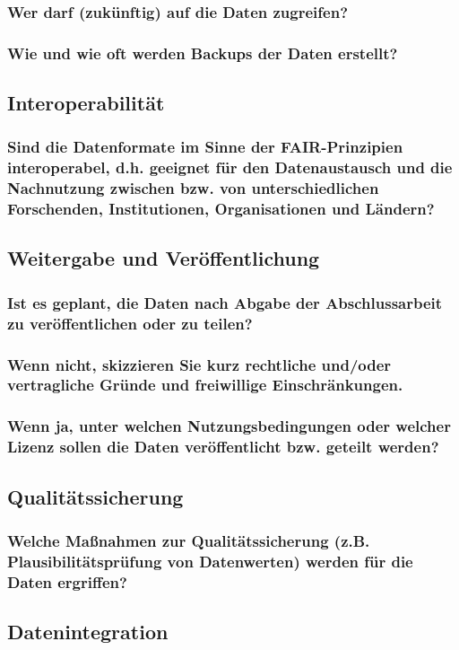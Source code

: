 \subsubsection*{Wer darf (zukünftig) auf die Daten zugreifen?}
\subsubsection*{Wie und wie oft werden Backups der Daten erstellt? }
\subsection*{Interoperabilität}
\subsubsection*{Sind die Datenformate im Sinne der FAIR-Prinzipien interoperabel, d.h. geeignet für den Datenaustausch und die Nachnutzung zwischen bzw. von unterschiedlichen Forschenden, Institutionen, Organisationen und Ländern?}
\subsection*{Weitergabe und Veröffentlichung}
\subsubsection*{Ist es geplant, die Daten nach Abgabe der Abschlussarbeit zu veröffentlichen oder zu teilen?}
\subsubsection*{Wenn nicht, skizzieren Sie kurz rechtliche und/oder vertragliche Gründe und freiwillige Einschränkungen.}
\subsubsection*{Wenn ja, unter welchen Nutzungsbedingungen oder welcher Lizenz sollen die Daten veröffentlicht bzw. geteilt werden?}
\subsection*{Qualitätssicherung}
\subsubsection*{Welche Maßnahmen zur Qualitätssicherung (z.B. Plausibilitätsprüfung von Datenwerten) werden für die Daten ergriffen?}
\subsection*{Datenintegration}
